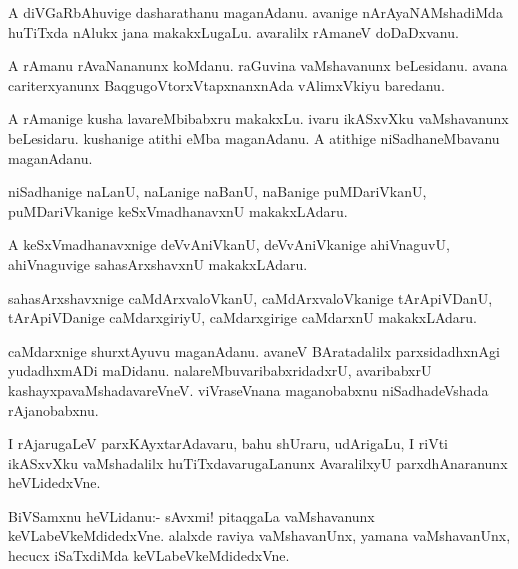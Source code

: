 \documentclass{article}
\begin{document}
\begin{mn}
A diVGaRbAhuvige dasharathanu maganAdanu. avanige nArAyaNAMshadiMda
huTiTxda nAlukx jana makakxLugaLu. avaralilx rAmaneV doDaDxvanu.
\end{mn}

\begin{mn}
A rAmanu rAvaNananunx koMdanu. raGuvina vaMshavanunx beLesidanu. avana
cariterxyanunx BaqgugoVtorxVtapxnanxnAda vAlimxVkiyu baredanu.
\end{mn}

\begin{mn}%
A rAmanige kusha lavareMbibabxru makakxLu. ivaru ikASxvXku
vaMshavanunx beLesidaru. kushanige atithi eMba maganAdanu. A atithige
niSadhaneMbavanu maganAdanu.
\end{mn}

\begin{mn}
niSadhanige naLanU, naLanige naBanU, naBanige puMDariVkanU,
puMDariVkanige keSxVmadhanavxnU makakxLAdaru.
\end{mn}

\begin{mn}
A keSxVmadhanavxnige deVvAniVkanU, deVvAniVkanige ahiVnaguvU,
ahiVnaguvige sahasArxshavxnU makakxLAdaru.
\end{mn}

\begin{mn}
sahasArxshavxnige caMdArxvaloVkanU, caMdArxvaloVkanige tArApiVDanU,
tArApiVDanige caMdarxgiriyU, caMdarxgirige caMdarxnU makakxLAdaru.
\end{mn}

\begin{mn}
caMdarxnige shurxtAyuvu maganAdanu. avaneV BAratadalilx
parxsidadhxnAgi yudadhxmADi maDidanu. nalareMbuvaribabxridadxrU,
avaribabxrU kashayxpavaMshadavareVneV. viVraseVnana maganobabxnu
niSadhadeVshada rAjanobabxnu.
\end{mn}

\begin{mn}%
I rAjarugaLeV parxKAyxtarAdavaru, bahu shUraru, udArigaLu, I riVti
ikASxvXku vaMshadalilx huTiTxdavarugaLanunx AvaralilxyU
parxdhAnaranunx heVLidedxVne.
\end{mn}

%
%
%


\begin{mn}%
BiVSamxnu heVLidanu:- sAvxmi! pitaqgaLa vaMshavanunx
keVLabeVkeMdidedxVne. alalxde raviya vaMshavanUnx, yamana
vaMshavanUnx, hecucx iSaTxdiMda keVLabeVkeMdidedxVne.
\end{mn}
\end{document}
